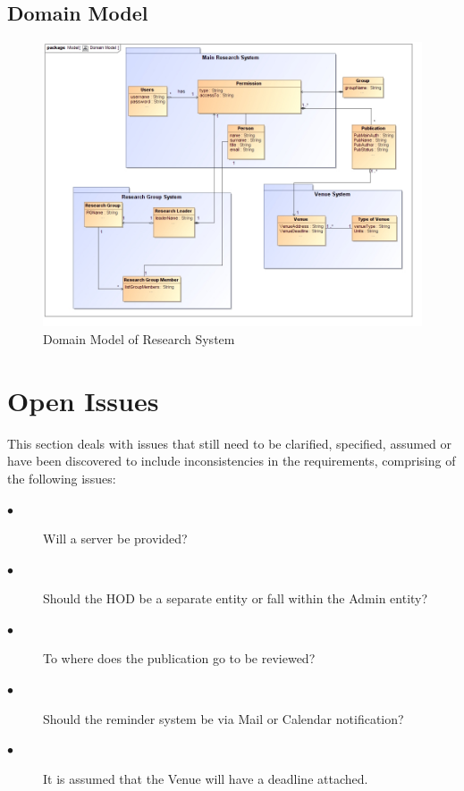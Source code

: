 \documentclass[a4paper]{article}
\begin{document}
	\subsection{Domain Model}
	\begin{figure}[H]
		\includegraphics[width=\textwidth]{../Assignment1/DomainModel.jpg}
		\caption{Domain Model of Research System \label{overflow}}
	\end{figure}
	\pagebreak
\section{Open Issues}
	This section deals with issues that still need to be clarified, specified, assumed or have been discovered to include inconsistencies in the requirements, comprising of the following issues:
	\begin{description}
		\item[$\bullet$] Will a server be provided?
	\end{description}
	\begin{description}
		\item[$\bullet$] Should the HOD be a separate entity or fall within the Admin entity?
	\end{description}
	\begin{description}
	\item[$\bullet$] To where does the publication go to be reviewed?
	\end{description}
	\begin{description}
	\item[$\bullet$] Should the reminder system be via Mail or Calendar notification?
	\end{description}
	\begin{description}
	\item[$\bullet$] It is assumed that the Venue will have a deadline attached.
	\end{description}
		
\end{document}
